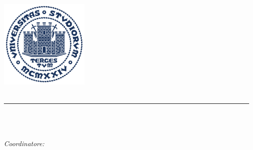 
\begin{titlepage} 

\newcommand{\HRule}{\rule{\linewidth}{0.5mm}}

\null\vfill %


\begin{center}
\large
\sffamily
	
	\center %
	
	
	\includegraphics[width=0.33\textwidth]{Figure/logoUniTs_tondo.pdf}\\[0.5cm] 
	 
	
	\textsc{\LARGE \theUniversity}\\
	\HRule\\[0.5cm] %
	
	\textsc{\Large \theDepartment}\\[0.5cm] %
	
	\textsc{\large \theDegree}\\ %
	\textit{Coordinatore: \theCoordinator} \\ [0.5cm] 
	

\end{center}
\end{titlepage}
